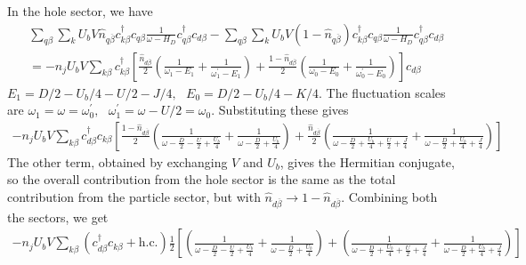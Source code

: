 \documentclass[reprint,superscriptaddress,floatfix]{revtex4-2}
\begin{document}
\begin{widetext}
In the hole sector, we have
\begin{equation}\begin{aligned}
	&\sum_{q\beta}\sum_{k}U_b V \hat n_{q\overline\beta} c^\dagger_{k\beta}c_{q\beta} \frac{1}{\omega - H_D} c^\dagger_{q\beta}c_{d\beta} -\sum_{q\beta}\sum_{k}U_b V \left(1 - \hat n_{q\overline\beta}\right) c^\dagger_{k\beta}c_{q\beta} \frac{1}{\omega - H_D} c^\dagger_{q\beta}c_{d\beta}\\
	&= -n_jU_b V\sum_{k\beta} c^\dagger_{k\beta} \left[\frac{\hat n_{d\overline\beta}}{2}\left(\frac{1}{\omega_1 - E_1} + \frac{1}{\omega^\prime_1 - E_1}\right) + \frac{1-\hat n_{d\overline\beta}}{2}\left(\frac{1}{\omega_0 - E_0} + \frac{1}{\omega_0^\prime - E_0}\right)\right] c_{d\beta}
\end{aligned}\end{equation}
\(E_1 = D/2 - U_b/4 - U/2 - J/4,~ ~ ~ E_0 = D/2 - U_b/4 - K/4\). The fluctuation scales are \(\omega_1 = \omega = \omega_0^\prime,~ ~ ~ \omega_1^\prime = \omega - U/2 = \omega_0\). Substituting these gives
\begin{equation}\begin{aligned}
	-n_jU_b V\sum_{k\beta} c^\dagger_{d\beta} c_{k\beta} \left[\frac{1 - \hat n_{d\overline\beta}}{2}\left(\frac{1}{\omega - \frac{D}{2} - \frac{U}{2} + \frac{U_b}{4}} + \frac{1}{\omega - \frac{D}{2} + \frac{U_b}{4}}\right) + \frac{\hat n_{d\overline\beta}}{2}\left(\frac{1}{\omega - \frac{D}{2} + \frac{U_b}{4} + \frac{U}{2} + \frac{J}{4}} + \frac{1}{\omega - \frac{D}{2} + \frac{U_b}{4} + \frac{J}{4}}\right)\right]
\end{aligned}\end{equation}
The other term, obtained by exchanging \(V\) and \(U_b\), gives the Hermitian conjugate, so the overall contribution from the hole sector is the same as the total contribution from the particle sector, but with \(\hat n_{d\overline\beta} \to 1 - \hat n_{d\overline\beta}\). Combining both the sectors, we get
\begin{equation}\begin{aligned}
	-n_jU_b V\sum_{k\beta} \left(c^\dagger_{d\beta} c_{k\beta} + \text{h.c.}\right) \frac{1}{2}\left[\left(\frac{1}{\omega - \frac{D}{2} - \frac{U}{2} + \frac{U_b}{4}} + \frac{1}{\omega - \frac{D}{2} + \frac{U_b}{4}}\right) + \left(\frac{1}{\omega - \frac{D}{2} + \frac{U_b}{4} + \frac{U}{2} + \frac{J}{4}} + \frac{1}{\omega - \frac{D}{2} + \frac{U_b}{4} + \frac{J}{4}}\right)\right]
\end{aligned}\end{equation}
\end{widetext}
\end{document}
